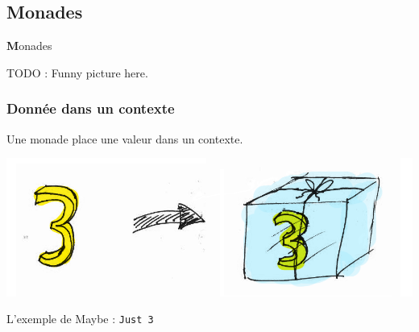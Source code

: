 \documentclass{beamer}
\begin{document}
\subsection{Monades}

\begin{frame}

\begin{center}\textbf Monades\end{center}

TODO : Funny picture here.
\end{frame}

\begin{frame}
\frametitle{Donnée dans un contexte}

\begin{block}{}
Une monade place une valeur dans un contexte.
\end{block}

\begin{center}
\includegraphics[scale=0.3]{just3.png}
\end{center}

\begin{exampleblock}{}
L'exemple de Maybe : \verb!Just 3!
\end{exampleblock}
\end{frame}
\end{document}
